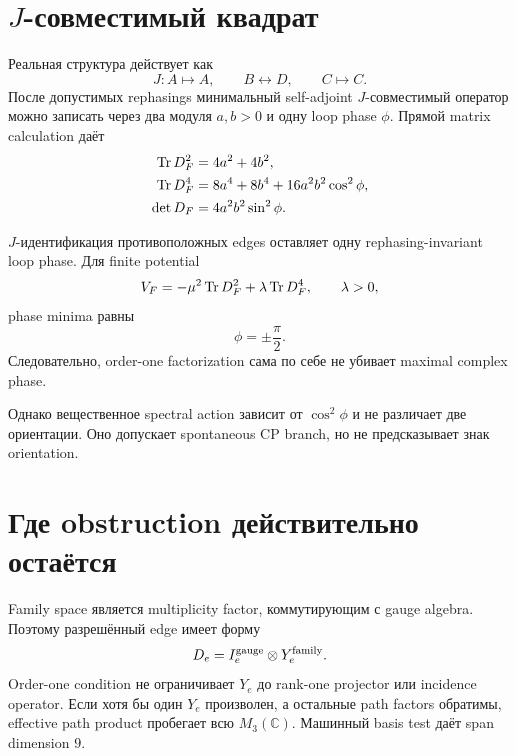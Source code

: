 \section{\texorpdfstring{\(J\)}{J}-совместимый квадрат}

Реальная структура действует как
\begin{equation}
 J:A\mapsto A,\qquad B\leftrightarrow D,\qquad C\mapsto C.
\end{equation}
После допустимых rephasings минимальный self-adjoint \(J\)-совместимый
оператор можно записать через два модуля \(a,b>0\) и одну loop phase
\(\phi\). Прямой matrix calculation даёт
\begin{align}
 \operatorname{Tr} D_F^2 &=4a^2+4b^2,\\
 \operatorname{Tr} D_F^4 &=8a^4+8b^4+16a^2b^2\cos^2\phi,\\
 \det D_F &=4a^2b^2\sin^2\phi.
\end{align}

\begin{proposition}
\(J\)-идентификация противоположных edges оставляет одну
rephasing-invariant loop phase. Для finite potential
\begin{equation}
 V_F=-\mu^2\operatorname{Tr} D_F^2+\lambda\operatorname{Tr} D_F^4,
 \qquad \lambda>0,
\end{equation}
phase minima равны
\begin{equation}
 \phi=\pm\frac{\pi}{2}.
\end{equation}
Следовательно, order-one factorization сама по себе не убивает maximal
complex phase.
\end{proposition}

Однако вещественное spectral action зависит от \(\cos^2\phi\) и не различает
две ориентации. Оно допускает spontaneous CP branch, но не предсказывает знак
orientation.

\section{Где obstruction действительно остаётся}

Family space является multiplicity factor, коммутирующим с gauge algebra.
Поэтому разрешённый edge имеет форму
\begin{equation}
 D_e=I_e^{\rm gauge}\otimes Y_e^{\rm family}.
\end{equation}
Order-one condition не ограничивает \(Y_e\) до rank-one projector или
incidence operator. Если хотя бы один \(Y_e\) произволен, а остальные path
factors обратимы, effective path product пробегает всю
\(M_3(\mathbb C)\). Машинный basis test даёт span dimension \(9\).

